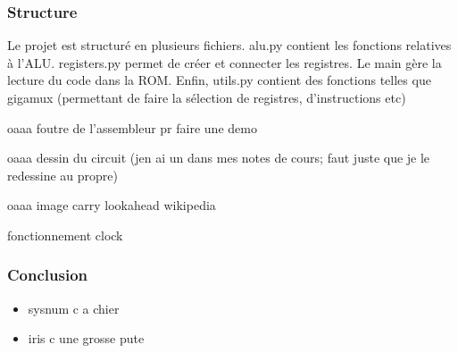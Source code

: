 \documentclass[12pt]{beamer}
\begin{document}
\begin{frame}
\frametitle{Structure}
   
   Le projet est structuré en plusieurs fichiers. alu.py contient les fonctions relatives à 
   l'ALU. registers.py permet de créer et connecter les registres. Le main gère la lecture du code
   dans la ROM. Enfin, utils.py contient des fonctions telles que gigamux (permettant de faire la sélection
   de registres, d'instructions etc)
\end{frame}

\begin{frame}{oaaa}
foutre de l'assembleur pr faire une demo
\end{frame}


\begin{frame}{oaaa}
    dessin du circuit (jen ai un dans mes notes de cours; faut juste que je le redessine au propre)
\end{frame}


\begin{frame}{oaaa}
    image carry lookahead wikipedia
\end{frame}

\begin{frame}
    fonctionnement clock
\end{frame}
    
\begin{frame}
\frametitle{Conclusion}
\begin{itemize}
    \item sysnum c a chier
    \item iris c une grosse pute
\end{itemize}
\end{frame}
\end{document}
